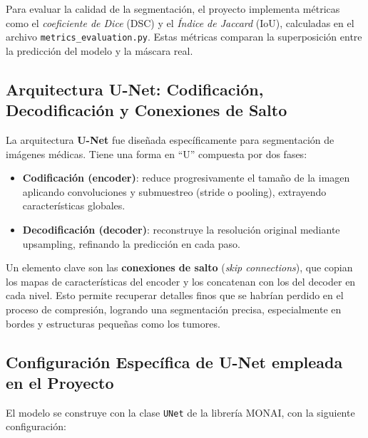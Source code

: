 \documentclass[12pt]{article}
\begin{document}
Para evaluar la calidad de la segmentación, el proyecto implementa métricas como el \textit{coeficiente de Dice} (DSC) y el \textit{Índice de Jaccard} (IoU), calculadas en el archivo \texttt{metrics\_evaluation.py}. Estas métricas comparan la superposición entre la predicción del modelo y la máscara real. \cite{taha2015metrics}

\subsection*{Arquitectura U-Net: Codificación, Decodificación y Conexiones de Salto}  
La arquitectura \textbf{U-Net} fue diseñada específicamente para segmentación de imágenes médicas. Tiene una forma en “U” compuesta por dos fases:

\begin{itemize}
  \item \textbf{Codificación (encoder)}: reduce progresivamente el tamaño de la imagen aplicando convoluciones y submuestreo (stride o pooling), extrayendo características globales.
  \item \textbf{Decodificación (decoder)}: reconstruye la resolución original mediante upsampling, refinando la predicción en cada paso.
\end{itemize}

Un elemento clave son las \textbf{conexiones de salto} (\textit{skip connections}), que copian los mapas de características del encoder y los concatenan con los del decoder en cada nivel. Esto permite recuperar detalles finos que se habrían perdido en el proceso de compresión, logrando una segmentación precisa, especialmente en bordes y estructuras pequeñas como los tumores.

\subsection*{Configuración Específica de U-Net empleada en el Proyecto}
El modelo se construye con la clase \texttt{UNet} de la librería MONAI, \cite{monai_unet, monai_dice_loss}con la siguiente configuración: 
\end{document}
